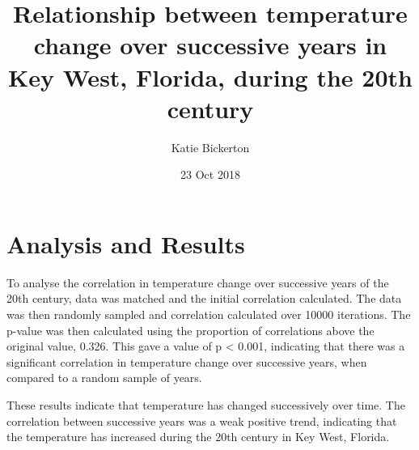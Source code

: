 \documentclass[11pt]{article}
\title{Relationship between temperature change over successive years in Key West, Florida, during the 20th century}
\author{Katie Bickerton}
\date{23 Oct 2018}
\begin{document}
    \maketitle

   	\section{Analysis and Results}
   	To analyse the correlation in temperature change over successive years of the 20th century, data was matched and the initial correlation calculated. The data was then randomly sampled and correlation calculated over 10000 iterations. The p-value was then calculated using the proportion of correlations above the original value, 0.326. This gave a value of p < 0.001, indicating that there was a significant correlation in temperature change over successive years, when compared to a random sample of years. 
   	
   	These results indicate that temperature has changed successively over time. The correlation between successive years was a weak positive trend, indicating that the temperature has increased during the 20th century in Key West, Florida.

 
\end{document}
